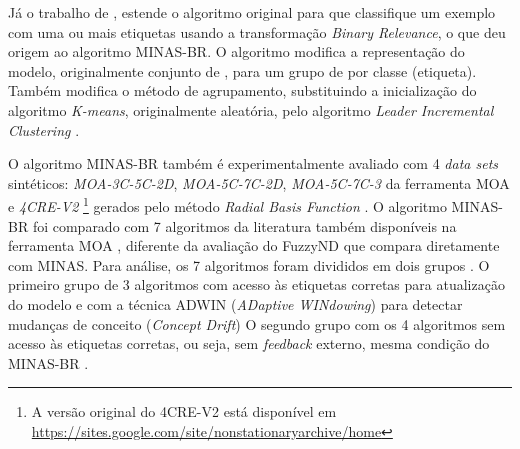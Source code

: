 
Já o trabalho de , estende o algoritmo original para que
classifique um exemplo com uma ou mais etiquetas usando a transformação
\emph{Binary Relevance}, o que deu origem ao algoritmo MINAS-BR.
O algoritmo modifica a representação do modelo, originalmente conjunto de \clusters, para
um grupo de \clusters por classe (etiqueta).
Também modifica o método de agrupamento, substituindo a inicialização do 
algoritmo \emph{K-means}, originalmente aleatória, pelo algoritmo 
\emph{Leader Incremental Clustering} \cite{Vijaya2004505}.


O algoritmo MINAS-BR também é experimentalmente avaliado com 4 \emph{data sets}
sintéticos: \emph{MOA-3C-5C-2D}, \emph{MOA-5C-7C-2D}, \emph{MOA-5C-7C-3} da
ferramenta MOA \cite{MOA} e \emph{4CRE-V2}
\footnote{
    A versão original do \dataset 4CRE-V2 está disponível em
    \url{https://sites.google.com/site/nonstationaryarchive/home}
}
gerados pelo método \emph{Radial Basis Function} \cite{souza2015,Costa2019}.
O algoritmo MINAS-BR foi comparado com 7 algoritmos da literatura também
disponíveis na ferramenta MOA \cite{MOA}, diferente da avaliação do FuzzyND que
compara diretamente com MINAS. Para análise, os 7 algoritmos foram divididos em
dois grupos \cite{Costa2019}.
O primeiro grupo de 3 algoritmos com acesso às etiquetas corretas para
atualização do modelo e com a técnica ADWIN (\emph{ADaptive WINdowing}) para detectar
mudanças de conceito (\emph{Concept Drift})
O segundo grupo com os 4 algoritmos sem acesso às etiquetas corretas,
ou seja, sem \emph{feedback} externo, mesma condição do MINAS-BR \cite{Costa2019}.


